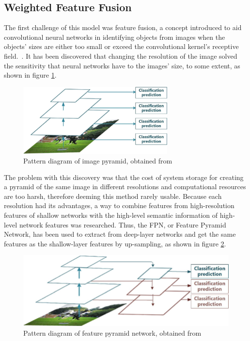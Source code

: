 \subsection{Weighted Feature Fusion}

The first challenge of this model was feature fusion, a concept introduced to aid convolutional neural networks in identifying objects from images when the objects' sizes are either too small or exceed the convolutional kernel's receptive field.~\cite{carte9}. It has been discovered that changing the resolution of the image solved the sensitivity that neural networks have to the images' size, to some extent, as shown in figure \ref{fig:fig4}.

\begin{figure}[!ht]
    \centering
    \includegraphics[width=0.7\textwidth]{figures/Figure4.png}
    \caption{Pattern diagram of image pyramid, obtained from ~\cite{link13}}
    \label{fig:fig4}
\end{figure}

The problem with this discovery was that the cost of system storage for creating a pyramid of the same image in different resolutions and computational resources are too harsh, therefore deeming this method rarely usable. Because each resolution had its advantages, a way to combine features from high-resolution features of shallow networks with the high-level semantic information of high-level network features was researched. Thus, the FPN, or Feature Pyramid Network, has been used to extract from deep-layer networks and get the same features as the shallow-layer features by up-sampling, as shown in figure \ref{fig:fig5}. 

\begin{figure}[!ht]
    \centering
    \includegraphics[width=0.7\linewidth]{figures/Figure5.png}
    \caption{Pattern diagram of feature pyramid network, obtained from ~\cite{link12}}
    \label{fig:fig5}
\end{figure}


